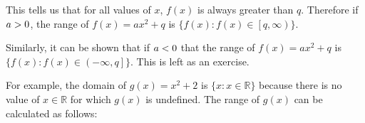           
          \label{m39345*id242387}This tells us that for all values of \begin{math}x\end{math}, \begin{math}f\left(x\right)\end{math} is always greater than \begin{math}q\end{math}. Therefore if \begin{math}a>{}0\end{math}, the range of \begin{math}f\left(x\right)=a{x}^{2}+q\end{math} is \begin{math}\{f\left(x\right):f\left(x\right)\in \left[q,\infty \right)\}\end{math}.\par 
          \label{m39345*id242519}Similarly, it can be shown that if \begin{math}a<{}0\end{math} that the range of \begin{math}f\left(x\right)=a{x}^{2}+q\end{math} is \begin{math}\{f\left(x\right):f\left(x\right)\in \left(-\infty ,q\right]\}\end{math}. This is left as an exercise.\par 
          \label{m39345*id242620}For example, the domain of \begin{math}g\left(x\right)={x}^{2}+2\end{math} is \begin{math}\{x:x\in \mathbb{R}\}\end{math} because there is no value of \begin{math}x\in \mathbb{R}\end{math} for which \begin{math}g\left(x\right)\end{math} is undefined. The range of \begin{math}g\left(x\right)\end{math} can be calculated as follows:\par 
          \label{m39345*id242733}\nopagebreak\noindent{}
